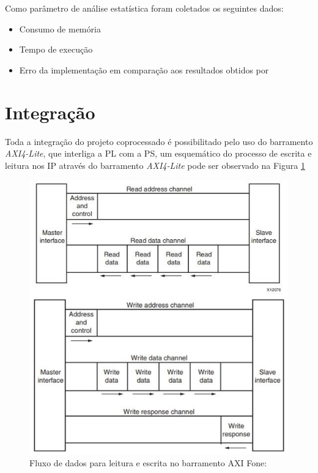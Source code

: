 Como parâmetro de análise estatística foram coletados os seguintes dados:

\begin{itemize}[noitemsep]
\item Consumo de memória
\item Tempo de execução
\item Erro da implementação em comparação aos resultados obtidos por \cite{F.Lotte}
\end{itemize}

\section{Integração}
Toda a integração do projeto coprocessado é possibilitado pelo uso do barramento \textit{AXI4-Lite}, que interliga a PL com a PS, 
um esquemático do processo de escrita e leitura nos IP através do barramento \textit{AXI4-Lite} pode ser observado na Figura \ref{axi_bus}
\newpage

\begin{figure}[h]
	\centering
	\includegraphics[keepaspectratio=true,scale=0.5]{figuras/axi_bus.png}
	\caption{Fluxo de dados para leitura e escrita no barramento AXI Fone: \cite{user-guide-axi}}
	\label{axi_bus}
\end{figure}

